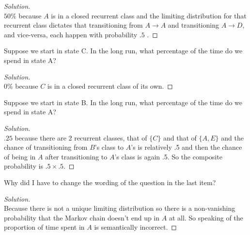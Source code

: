 \documentclass[12pt]{article}
\newenvironment{problem}[2][Problem]{\begin{trivlist}
\item[\hskip \labelsep {\bfseries #1}\hskip \labelsep {\bfseries #2.}]}{\end{trivlist}}
\newenvironment{solution}
  {\begin{proof}[Solution]\renewcommand{\qedsymbol}{}}
  {\end{proof}}
\begin{document}
\begin{solution}\ \\

$50\% $ because $A$ is in a closed recurrent class and the limiting distribution for that recurrent class dictates that transitioning from $A \rightarrow A$ and transitioning $A \rightarrow D$, and vice-versa, each happen with probability $ .5$ .

\end{solution}

\begin{problem}{3(d)} %
Suppose we start in state C. In the long run, what percentage of the time do we spend
in state A?

\end{problem}
\begin{solution}\ \\

$0\%$ because $C$ is in a closed recurrent class of its own.

\end{solution}

\begin{problem}{3(e)} %
Suppose we start in state B. In the long run, what percentage of the time do we spend
in state A?

\end{problem}
\begin{solution}\ \\

$.25$ because there are 2 recurrent classes, that of $\{C\}$ and that of $\{A,E\}$ and the chance of transitioning from $B$'s class to $A$'s is relatively .5 and then the chance of being in $A$ after transitioning to $A$'s class is again .5. So the composite probability is $.5 \times .5$.

\end{solution}

\begin{problem}{3(f)} %
Why did I have to change the wording of the question in the last item?


\end{problem}
\begin{solution}\ \\

Because there is not a unique limiting distribution so there is a non-vanishing probability that the Markov chain doesn't end up in $A$ at all. So speaking of the proportion of time spent in $A$ is semantically incorrect. 
\end{solution}
\end{document}
